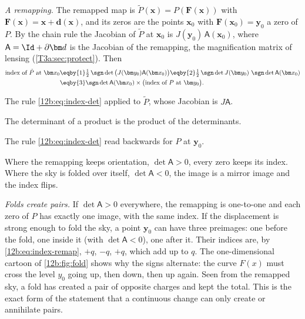 \emph{A remapping.} The remapped map is $\tilde P(\bm x)=P(\bm F(\bm x))$ with $\bm F(\bm x)=\bm x+\bm d(\bm x)$, and its
zeros are the points $\bm x_0$ with $\bm F(\bm x_0)=\bm y_0$ a zero of $P$. By the chain rule the Jacobian of $\tilde P$ at
$\bm x_0$ is $J(\bm y_0)\,\mathsf A(\bm x_0)$, where $\mathsf A=\Id+\partial\bm d$ is the Jacobian of the remapping, the
magnification matrix of lensing (\cref{T3a:sec:protect}). Then
\begin{align}
  \text{index of }\tilde P\text{ at }\bm x_0
  &\eqby{1}\tfrac12\,\sgn\det\big(J(\bm y_0)\mathsf A(\bm x_0)\big)
   \eqby{2}\tfrac12\,\sgn\det J(\bm y_0)\ \sgn\det\mathsf A(\bm x_0)\nonumber\\
  &\eqby{3}\sgn\det\mathsf A(\bm x_0)\times\big(\text{index of }P\text{ at }\bm y_0\big) .
  \label{12b:eq:index-remap}
\end{align}
\begin{explain}
  \item The rule \eqref{12b:eq:index-det} applied to $\tilde P$, whose Jacobian is $J\mathsf A$.
  \item The determinant of a product is the product of the determinants.
  \item The rule \eqref{12b:eq:index-det} read backwards for $P$ at $\bm y_0$.
\end{explain}
Where the remapping keeps orientation, $\det\mathsf A>0$, every zero keeps its index. Where the sky is folded over
itself, $\det\mathsf A<0$, the image is a mirror image and the index flips.

\emph{Folds create pairs.} If $\det\mathsf A>0$ everywhere, the remapping is one-to-one and each zero of $P$ has exactly
one image, with the same index. If the displacement is strong enough to fold the sky, a point $\bm y_0$ can have three
preimages: one before the fold, one inside it (with $\det\mathsf A<0$), one after it. Their indices are, by
\eqref{12b:eq:index-remap}, $+q$, $-q$, $+q$, which add up to $q$. The one-dimensional cartoon of
\cref{12b:fig:fold} shows why the signs alternate: the curve $F(x)$ must cross the level $y_0$ going up, then down, then
up again. Seen from the remapped sky, a fold has created a pair of opposite charges and kept the total. This is
the exact form of the statement that a continuous change can only create or annihilate pairs.

